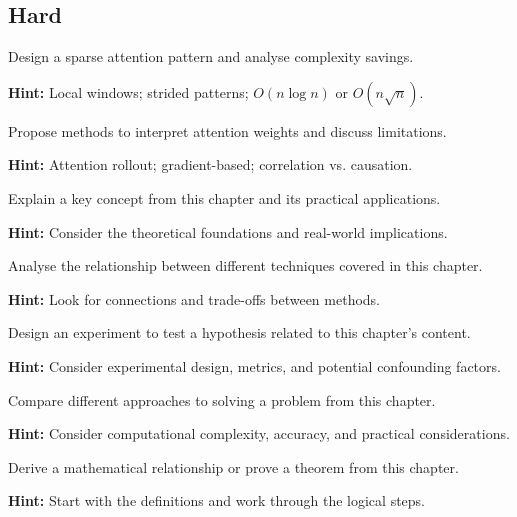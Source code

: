 \subsection*{Hard}

\begin{problem}
Design a sparse attention pattern and analyse complexity savings.

\textbf{Hint:} Local windows; strided patterns; $O(n \log n)$ or $O(n\sqrt{n})$.
\end{problem}

\begin{problem}
Propose methods to interpret attention weights and discuss limitations.

\textbf{Hint:} Attention rollout; gradient-based; correlation vs. causation.
\end{problem}


\begin{problem}
Explain a key concept from this chapter and its practical applications.

\textbf{Hint:} Consider the theoretical foundations and real-world implications.
\end{problem}

\begin{problem}
Analyse the relationship between different techniques covered in this chapter.

\textbf{Hint:} Look for connections and trade-offs between methods.
\end{problem}

\begin{problem}
Design an experiment to test a hypothesis related to this chapter's content.

\textbf{Hint:} Consider experimental design, metrics, and potential confounding factors.
\end{problem}

\begin{problem}
Compare different approaches to solving a problem from this chapter.

\textbf{Hint:} Consider computational complexity, accuracy, and practical considerations.
\end{problem}

\begin{problem}
Derive a mathematical relationship or prove a theorem from this chapter.

\textbf{Hint:} Start with the definitions and work through the logical steps.
\end{problem}

